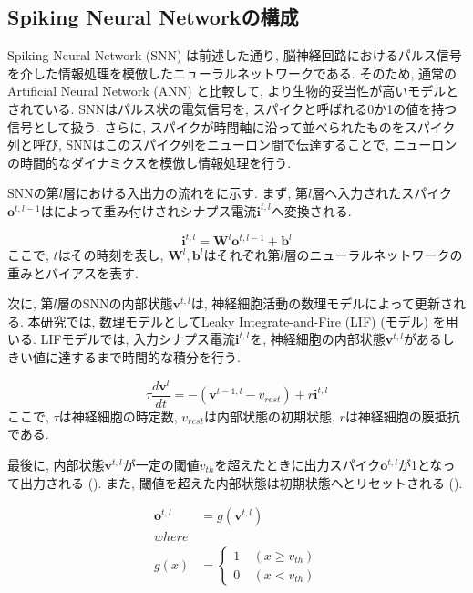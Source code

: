 \subsection{Spiking Neural Networkの構成}

Spiking Neural Network (SNN) は前述した通り, 脳神経回路におけるパルス信号を介した情報処理を模倣したニューラルネットワークである\cite{generalsnn}.
そのため, 通常のArtificial Neural Network (ANN) と比較して, より生物的妥当性が高いモデルとされている.
SNNはパルス状の電気信号を, スパイクと呼ばれる0か1の値を持つ信号として扱う.
さらに, スパイクが時間軸に沿って並べられたものをスパイク列と呼び, SNNはこのスパイク列をニューロン間で伝達することで, ニューロンの時間的なダイナミクスを模倣し情報処理を行う.

SNNの第$l$層における入出力の流れをに示す.
まず, 第$l$層へ入力されたスパイク$\bm{o}^{t, l-1}$はによって重み付けされシナプス電流$\bm{i}^{t,l}$へ変換される.

\begin{equation}
    \bm{i}^{t, l} = \bm{W}^l\bm{o}^{t, l-1} + \bm{b}^l
    \label{eq:input_spike}
\end{equation}
ここで, $t$はその時刻を表し, $\bm{W}^l, \bm{b}^l$はそれぞれ第$l$層のニューラルネットワークの重みとバイアスを表す.

次に, 第$l$層のSNNの内部状態$\bm{v}^{t, l}$は, 神経細胞活動の数理モデルによって更新される.
本研究では, 数理モデルとしてLeaky Integrate-and-Fire (LIF) (モデル) を用いる.
LIFモデルでは, 入力シナプス電流$\bm{i}^{t, l}$を, 神経細胞の内部状態$\bm{v}^{t, l}$があるしきい値に達するまで時間的な積分を行う.

\begin{equation}
    {\tau}\frac{d\bm{v}^l}{dt}=-\left(\bm{v}^{t-1,l}-v_{rest}\right)+r\bm{i}^{t, l}
    \label{eq:lif}
\end{equation}
ここで, $\tau$は神経細胞の時定数, $v_{rest}$は内部状態の初期状態, $r$は神経細胞の膜抵抗である.

最後に, 内部状態$\bm{v}^{t, l}$が一定の閾値$v_{th}$を超えたときに出力スパイク$\bm{o}^{t, l}$が1となって出力される ().
また, 閾値を超えた内部状態は初期状態へとリセットされる ().

\begin{equation}
    \begin{split}
      \bm{o}^{t, l}&=g\left(\bm{v}^{t, l}\right)\\
    where\\
    g\left(x\right)&=\left\{
      \begin{alignedat}{2}
        1 &\:\left(x{\geq}v_{th}\right)\\
        0 &\:\left(x{<}v_{th}\right)
      \end{alignedat}
    \right. 
    \end{split} \label{eq:outputSpike}
  \end{equation}

